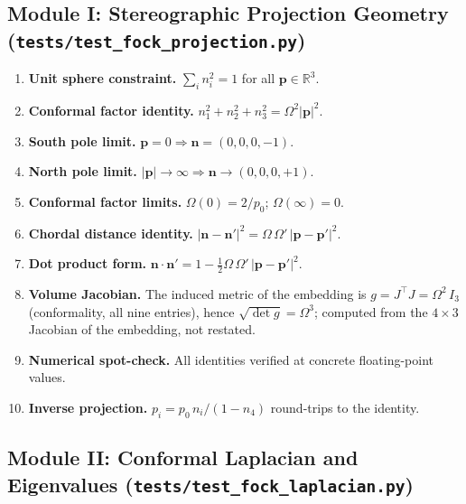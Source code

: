 \documentclass[aps,pra,twocolumn,superscriptaddress,longbibliography]{revtex4-2}
\begin{document}
\subsection{Module I: Stereographic Projection Geometry (\texttt{tests/test\_fock\_projection.py})}

\begin{enumerate}
\item \textbf{Unit sphere constraint.} $\sum_i n_i^2 = 1$ for all $\mathbf{p} \in \mathbb{R}^3$.
\item \textbf{Conformal factor identity.} $n_1^2 + n_2^2 + n_3^2 = \Omega^2 |\mathbf{p}|^2$.
\item \textbf{South pole limit.} $\mathbf{p} = 0 \Rightarrow \mathbf{n} = (0,0,0,-1)$.
\item \textbf{North pole limit.} $|\mathbf{p}| \to \infty \Rightarrow \mathbf{n} \to (0,0,0,+1)$.
\item \textbf{Conformal factor limits.} $\Omega(0) = 2/p_0$; $\Omega(\infty) = 0$.
\item \textbf{Chordal distance identity.} $|\mathbf{n} - \mathbf{n}'|^2 = \Omega\,\Omega'\,|\mathbf{p} - \mathbf{p}'|^2$.
\item \textbf{Dot product form.} $\mathbf{n} \cdot \mathbf{n}' = 1 - \tfrac{1}{2}\Omega\,\Omega'\,|\mathbf{p} - \mathbf{p}'|^2$.
\item \textbf{Volume Jacobian.} The induced metric of the embedding is $g = J^{\top}J = \Omega^2\, I_3$ (conformality, all nine entries), hence $\sqrt{\det g} = \Omega^3$; computed from the $4 \times 3$ Jacobian of the embedding, not restated.
\item \textbf{Numerical spot-check.} All identities verified at concrete floating-point values.
\item \textbf{Inverse projection.} $p_i = p_0\, n_i/(1 - n_4)$ round-trips to the identity.
\end{enumerate}

\subsection{Module II: Conformal Laplacian and Eigenvalues (\texttt{tests/test\_fock\_laplacian.py})}
\end{document}
